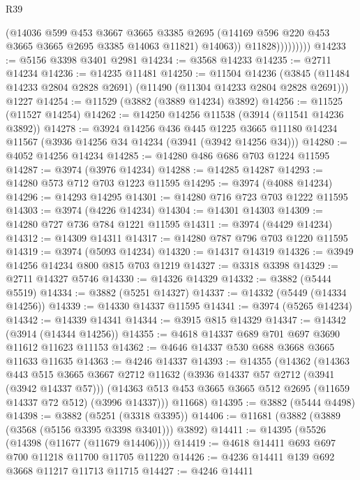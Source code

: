 \begin{lexlean}{R39}
\begin{coremodule}
                        (@14036
                          @599
                          @453
                          @3667
                          @3665
                          @3385
                          @2695
                          (@14169 @596 @220 @453 @3665 @3665 @2695 @3385 @14063 @11821)
                          @14063))
                      @11828)))))))))
@14233 := @5156 @3398 @3401 @2981
@14234 := @3568 @14233
@14235 := @2711 @14234
@14236 := @14235 @11481
@14250 := @11504
    @14236
    (@3845 (@11484 @14233 @2804 @2828 @2691) (@11490 (@11304 @14233 @2804 @2828 @2691)))
    @1227
@14254 := @11529 (@3882 (@3889 @14234) @3892)
@14256 := @11525 (@11527 @14254)
@14262 := @14250 @14256 @11538 (@3914 (@11541 @14236 @3892))
@14278 := @3924
    @14256
    @436
    @445
    @1225
    @3665
    @11180
    @14234
    @11567
    (@3936 @14256 @34 @14234 (@3941 (@3942 @14256 @34)))
@14280 := @4052 @14256 @14234
@14285 := @14280 @486 @686 @703 @1224 @11595
@14287 := @3974 (@3976 @14234)
@14288 := @14285 @14287
@14293 := @14280 @573 @712 @703 @1223 @11595
@14295 := @3974 (@4088 @14234)
@14296 := @14293 @14295
@14301 := @14280 @716 @723 @703 @1222 @11595
@14303 := @3974 (@4226 @14234)
@14304 := @14301 @14303
@14309 := @14280 @727 @736 @784 @1221 @11595
@14311 := @3974 (@4429 @14234)
@14312 := @14309 @14311
@14317 := @14280 @787 @796 @703 @1220 @11595
@14319 := @3974 (@5093 @14234)
@14320 := @14317 @14319
@14326 := @3949 @14256 @14234 @800 @815 @703 @1219
@14327 := @3318 @3398
@14329 := @2711 @14327 @5746
@14330 := @14326 @14329
@14332 := @3882 (@5444 @5519)
@14334 := @3882 (@5251 @14327)
@14337 := @14332 (@5449 (@14334 @14256))
@14339 := @14330 @14337 @11595
@14341 := @3974 (@5265 @14234)
@14342 := @14339 @14341
@14344 := @3915 @815 @14329
@14347 := @14342 (@3914 (@14344 @14256))
@14355 := @4618 @14337 @689 @701 @697 @3690 @11612 @11623 @11153
@14362 := @4646 @14337 @530 @688 @3668 @3665 @11633 @11635
@14363 := @4246 @14337
@14393 := @14355
    (@14362
      (@14363
        @443
        @515
        @3665
        @3667
        @2712
        @11632
        (@3936 @14337 @57 @2712 (@3941 (@3942 @14337 @57)))
        (@14363 @513 @453 @3665 @3665 @512 @2695 (@11659 @14337 @72 @512) (@3996 @14337)))
      @11668)
@14395 := @3882 (@5444 @4498)
@14398 := @3882 (@5251 (@3318 @3395))
@14406 := @11681 (@3882 (@3889 (@3568 (@5156 @3395 @3398 @3401))) @3892)
@14411 := @14395 (@5526 (@14398 (@11677 (@11679 @14406))))
@14419 := @4618 @14411 @693 @697 @700 @11218 @11700 @11705 @11220
@14426 := @4236 @14411 @139 @692 @3668 @11217 @11713 @11715
@14427 := @4246 @14411

\end{coremodule}
\end{lexlean}
